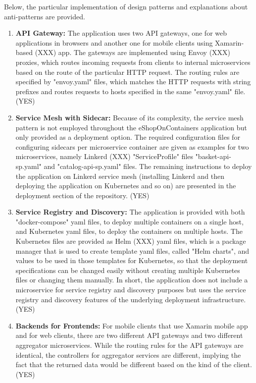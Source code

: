 \documentclass{Configuration_Files/PoliMi3i_thesis}
\begin{document}
Below, the particular implementation of design patterns and explanations about anti-patterns are provided.

\begin{enumerate}
    \item \textbf{API Gateway:} The application uses two API gateways, one for web applications in browsers and another one for mobile clients using Xamarin-based (XXX) app.
    The gateways are implemented using Envoy (XXX) proxies, which routes incoming requests from clients to internal microservices based on the route of the particular HTTP request.
    The routing rules are specified by "envoy.yaml" files, which matches the HTTP requests with string prefixes and routes requests to hosts specified in the same "envoy.yaml" file. (YES)
    
    \item \textbf{Service Mesh with Sidecar:} Because of its complexity, the service mesh pattern is not employed throughout the eShopOnContainers application but only provided as a deployment option.
    The required configuration files for configuring sidecars per microservice container are given as examples for two microservices, namely Linkerd (XXX) "ServiceProfile" files "basket-api-sp.yaml" and "catalog-api-sp.yaml" files.
    The remaining instructions to deploy the application on Linkerd service mesh (installing Linkerd and then deploying the application on Kubernetes and so on) are presented in the deployment section of the repository. (YES)
    
    \item \textbf{Service Registry and Discovery:} The application is provided with both "docker-compose" yaml files, to deploy multiple containers on a single host, and Kubernetes yaml files, to deploy the containers on multiple hosts. 
    The Kubernetes files are provided as Helm (XXX) yaml files, which is a package manager that is used to create template yaml files, called "Helm charts", and values to be used in those templates for Kubernetes, so that the deployment specifications can be changed easily without creating multiple Kubernetes files or changing them manually.
    In short, the application does not include a microservice for service registry and discovery purposes but uses the service registry and discovery features of the underlying deployment infrastructure. (YES)
    
    \item \textbf{Backends for Frontends:} For mobile clients that use Xamarin mobile app and for web clients, there are two different API gateways and two different aggregator microservices.
    While the routing rules for the API gateways are identical, the controllers for aggregator services are different, implying the fact that the returned data would be different based on the kind of the client. (YES)
    

\end{enumerate}
\end{document}
